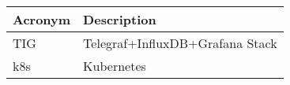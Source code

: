 \addtocounter{table}{-1}
\begin{longtable}{p{}p{}}\hline
\textbf{Acronym} & \textbf{Description}  \\\hline

TIG & Telegraf+InfluxDB+Grafana Stack \\\hline
k8s & Kubernetes \\\hline
\end{longtable}
